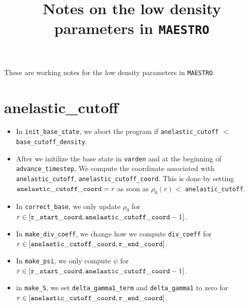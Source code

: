 \documentclass[11pt]{article}
\title{Notes on the low density parameters in {\tt MAESTRO}}
\begin{document}
\maketitle
\tableofcontents

These are working notes for the low density parameters in {\tt MAESTRO}.
\section{anelastic\_cutoff}
\begin{itemize}
\item In {\tt init\_base\_state}, we abort the program if {\tt anelastic\_cutoff} $<$ {\tt base\_cutoff\_density}.
\item After we initilize the base state in {\tt varden} and at the beginning of {\tt advance\_timestep}, We compute the coordinate associated with {\tt anelastic\_cutoff}, {\tt anelastic\_cutoff\_coord}.  This is done by setting ${\tt anelastic\_cutoff\_coord}= r$ as soon as $\rho_0(r) <$ {\tt anelastic\_cutoff}.
\item In {\tt correct\_base}, we only update $\rho_0$ for $r\in[{\tt r\_start\_coord},{\tt anelastic\_cutoff\_coord}-1]$.
\item In {\tt make\_div\_coeff}, we change how we compute {\tt div\_coeff} for $r\in[{\tt anelastic\_cutoff\_coord},{\tt r\_end\_coord}]$.
\item In {\tt make\_psi}, we only compute $\psi$ for $r\in[{\tt r\_start\_coord},{\tt anelastic\_cutoff\_coord}-1]$.
\item in {\tt make\_S}, we set {\tt delta\_gamma1\_term} and {\tt delta\_gamma1} to zero for $r\in[{\tt anelastic\_cutoff\_coord},{\tt r\_end\_coord}]$.
\end{itemize}
\end{document}
